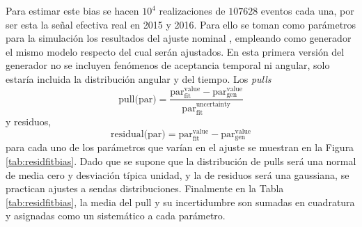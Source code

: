 Para estimar este bias se hacen $10^4$ realizaciones de $107628$ eventos cada una, por ser esta la señal efectiva real en 2015 y 2016. Para ello se toman como parámetros para la simulación los resultados del ajuste nominal \cite{paperPhis}, empleando como generador el mismo modelo respecto del cual serán ajustados. En esta primera versión del generador no se incluyen fenómenos de aceptancia temporal ni angular, solo estaría incluida la distribución angular y del tiempo.
Los \textit{pulls} 
\begin{equation}
  \text{pull(par)} = \mathrm{ \frac{ par_{fit}^{value} - par_{gen}^{value} }{ par_{fit}^{uncertainty} } }
\end{equation}
y residuos,
\begin{equation}
  \text{residual(par)} = \mathrm{  par_{fit}^{value} - par_{gen}^{value} } 
\end{equation}
para cada uno de los parámetros que varían en el ajuste se muestran en la Figura \ref{tab:residfitbias}. Dado que se supone que la distribución de pulls será una normal de media cero y desviación típica unidad, y la de residuos será una gaussiana, se practican ajustes a sendas distribuciones. Finalmente en la Tabla \ref{tab:residfitbias}, la media del pull y su incertidumbre son sumadas en cuadratura y asignadas como un sistemático a cada parámetro. 

